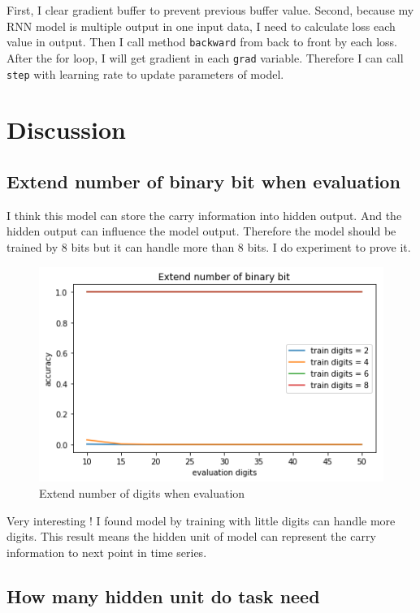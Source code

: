 \documentclass[12pt]{article}
\begin{document}
First, I clear gradient buffer to prevent previous buffer value. Second, because my RNN model is multiple output in one input data, I need to calculate loss each value in output. Then I call method \verb|backward| from back to front by each loss. After the for loop, I will get gradient in each \verb|grad| variable. Therefore I can call \verb|step| with learning rate to update parameters of model.

\newpage

\section{Discussion}

\subsection{Extend number of binary bit when evaluation}

I think this model can store the carry information into hidden output. And the hidden output can influence the model output. Therefore the model should be trained by 8 bits but it can handle more than 8 bits. I do experiment to prove it.

\begin{figure}[H]
\centering
\includegraphics[width=\linewidth]{Images/ExtendED.png}
\caption{Extend number of digits when evaluation}
\end{figure}

Very interesting ! I found model by training with little digits can handle more digits. This result means the hidden unit of model can represent the carry information to next point in time series.

\subsection{How many hidden unit do task need}
\end{document}
